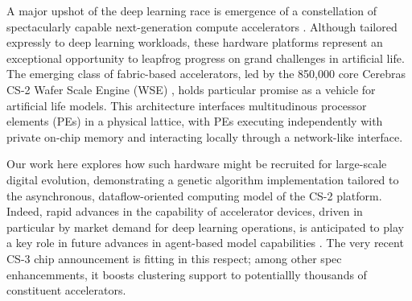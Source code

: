 

A major upshot of the deep learning race is emergence of a constellation of spectacularly capable next-generation compute accelerators \citep{zhang2016cambricon,emani2021accelerating,jia2019dissecting,medina2020habana}.
Although tailored expressly to deep learning workloads, these hardware platforms represent an exceptional opportunity to leapfrog progress on grand challenges in artificial life.
The emerging class of fabric-based accelerators, led by the 850,000 core Cerebras CS-2 Wafer Scale Engine (WSE) \citep{lauterbach2021path,lie2022cerebras}, holds particular promise as a vehicle for artificial life models.
This architecture interfaces multitudinous processor elements (PEs) in a physical lattice, with PEs executing independently with private on-chip memory and interacting locally through a network-like interface.

Our work here explores how such hardware might be recruited for large-scale digital evolution, demonstrating a genetic algorithm implementation tailored to the asynchronous, dataflow-oriented computing model of the CS-2 platform.
Indeed, rapid advances in the capability of accelerator devices, driven in particular by market demand for deep learning operations, is anticipated to play a key role in future advances in agent-based model capabilities \citep{perumalla2022computer}.
The very recent CS-3 chip announcement is fitting in this respect; among other spec enhancemments, it boosts clustering support to potentiallly thousands of constituent accelerators.

